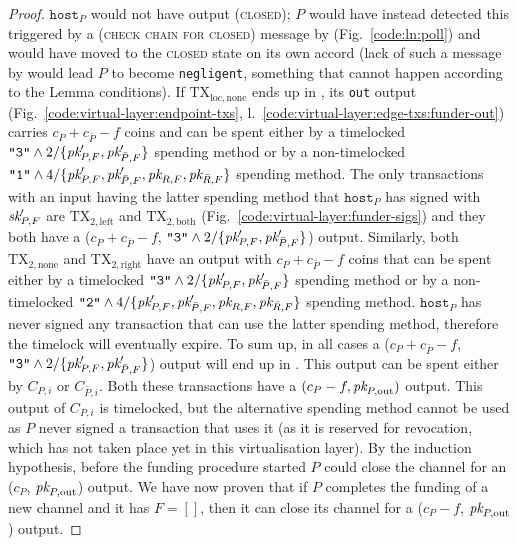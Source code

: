 \begin{proof}
  $\texttt{host}_P$ would not have output (\textsc{closed}); $P$ would have
  instead detected this triggered by a (\textsc{check chain for closed}) message
  by \environment (Fig.~\ref{code:ln:poll}) and would have moved to the
  \textsc{closed} state on its own accord (lack of such a message by
  \environment would lead $P$ to become \texttt{negligent}, something that
  cannot happen according to the Lemma conditions). If
  $\mathrm{TX}_{\mathrm{loc}, \mathrm{none}}$ ends up in \ledger, its
  \texttt{out} output (Fig.~\ref{code:virtual-layer:endpoint-txs},
  l.~\ref{code:virtual-layer:edge-txs:funder-out}) carries $c_P + c_{\bar{P}} -
  f$ coins and can be spent either by a timelocked $\texttt{"3"} \wedge
  2/\{\textit{pk}_{P, F}', \textit{pk}_{\bar{P}, F}'\}$ spending method or by a non-timelocked
  $\texttt{"1"} \wedge 4/\{\textit{pk}_{P, F}', \textit{pk}_{\bar{P}, F}', \textit{pk}_{R, F}, \textit{pk}_{\bar{R},
  F}\}$ spending method. The only transactions with an input having the latter
  spending method that $\texttt{host}_P$ has signed with $\textit{sk}_{P, F}'$ are
  $\mathrm{TX}_{2, \mathrm{left}}$ and $\mathrm{TX}_{2, \mathrm{both}}$
  (Fig.~\ref{code:virtual-layer:funder-sigs}) and they both have a ($c_P +
  c_{\bar{P}} - f$, $\texttt{"3"} \wedge 2/\{\textit{pk}_{P,F}', \textit{pk}_{\bar{P},F}'\}$)
  output. Similarly, both $\mathrm{TX}_{2, \mathrm{none}}$ and $\mathrm{TX}_{2,
  \mathrm{right}}$ have an output with $c_P + c_{\bar{P}} - f$ coins that can be
  spent either by a timelocked $\texttt{"3"} \wedge 2/\{\textit{pk}_{P,F}',
  \textit{pk}_{\bar{P},F}'\}$ spending method or by a non-timelocked $\texttt{"2"} \wedge
  4/\{\textit{pk}_{P, F}', \textit{pk}_{\bar{P}, F}', \textit{pk}_{R, F}, \textit{pk}_{\bar{R}, F}\}$ spending
  method.  $\texttt{host}_P$ has never signed any transaction that can use the
  latter spending method, therefore the timelock will eventually expire. To sum
  up, in all cases a ($c_P + c_{\bar{P}} - f$, $\texttt{"3"} \wedge
  2/\{\textit{pk}_{P,F}', \textit{pk}_{\bar{P},F}'\}$) output will end up in \ledger. This output
  can be spent either by $C_{P, i}$ or $C_{\bar{P}, i}$.  Both these
  transactions have a $(c_P - f, \textit{pk}_{P, \mathrm{out}})$ output. This output of
  $C_{P, i}$ is timelocked, but the alternative spending method cannot be used
  as $P$ never signed a transaction that uses it (as it is reserved for
  revocation, which has not taken place yet in this virtualisation layer).  By
  the induction hypothesis, before the funding procedure started $P$ could close
  the channel for an ($c_P$, $\textit{pk}_{P, \mathrm{out}}$) output. We have now proven
  that if $P$ completes the funding of a new channel and it has $F = []$, then
  it can close its channel for a ($c_P - f$, $\textit{pk}_{P, \mathrm{out}}$) output.

\end{proof}
